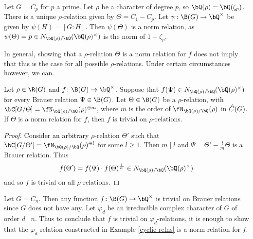 
\begin{example}
    Let $G = C_p$ for $p$ a prime. Let $\rho$ be a character of degree $p$, so $\bQ(\rho) = \bQ(\zeta_p)$. There is a unique $\rho$-relation given by $\Theta = C_1 - C_p$. Let $\psi \colon \B(G) \to \bQ^{\times}$ be given by $\psi(H) = [G \colon H]$. Then $\psi(\Theta)$ is a norm relation, as $\psi(\Theta) = p \in \fieldnorm{\rho}$ is the norm of $1 - \zeta_p$.
\end{example}

In general, showing that a $\rho$-relation $\Theta$ is a norm relation for $f$ does not imply that this is the case for all possible $\rho$-relations. Under certain circumstances however, we can.

\begin{prop}\label{min-to-all}
    Let $\rho \in \R(G)$ and $f \colon \B(G) \to \bQ^{\times}$. Suppose that $f(\Psi) \in \fieldnorm{\rho}$ for every Brauer relation $\Psi \in \B(G)$. 
    Let $\Theta \in \B(G)$ be a $\rho$-relation, with $\bC[G / \Theta] = \repnorm{\rho}^{\oplus m}$, where $m$ is the order of $\repnorm{\rho}$ in $\hat{C}(G)$. 
    If $\Theta$ is a norm relation for $f$, then $f$ is trivial on $\rho$-relations. 
\end{prop}

\begin{proof}
    Consider an arbitrary $\rho$-relation $\Theta'$ such that $\bC[G / \Theta'] = \repnorm{\rho}^{\oplus l}$ for some $l \geq 1$. Then $m \mid l$ and $\Psi = \Theta' - \frac{l}{m}\Theta$ is a Brauer relation. Thus
    \[ f(\Theta') = f(\Psi)\cdot f(\Theta)^{\frac{l}{m}} \in \fieldnorm{\rho} \]
    and so $f$ is trivial on all $\rho$-relations.
\end{proof}

\begin{example}
    Let $G = C_n$. Then any function $f \colon \B(G) \to \bQ^{\times}$ is trivial on Brauer relations since $G$ does not have any. Let $\varphi_d$ be an irreducible complex character of $G$ of order $d \mid n$. Thus to conclude that $f$ is trivial on $\varphi_d$-relations, it is enough to show that the $\varphi_d$-relation constructed in Example \ref{cyclic-relns} is a norm relation for $f$.
\end{example}


